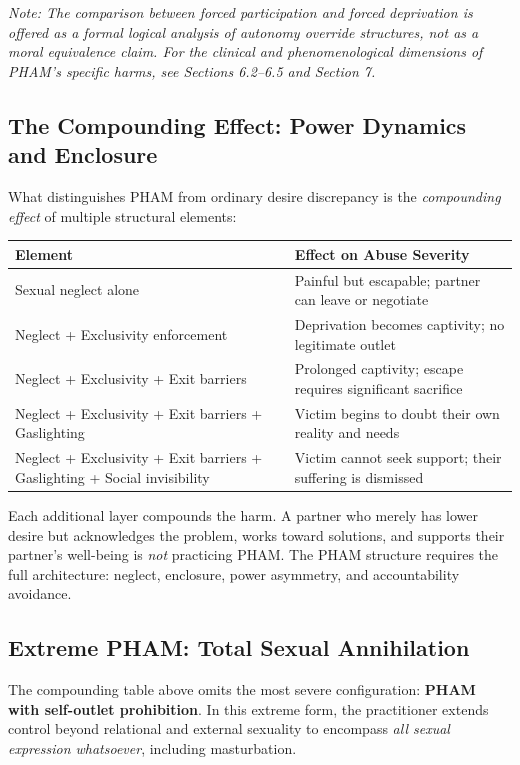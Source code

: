 \documentclass[12pt,openany]{book}
\numberwithin{equation}{chapter}
\begin{document}
\textit{Note: The comparison between forced participation and forced deprivation is offered as a formal logical analysis of autonomy override structures, not as a moral equivalence claim. For the clinical and phenomenological dimensions of PHAM's specific harms, see Sections 6.2--6.5 and Section 7.}

\subsection{The Compounding Effect: Power Dynamics and Enclosure}

What distinguishes PHAM from ordinary desire discrepancy is the \textit{compounding effect} of multiple structural elements:

\begin{center}
\begin{tabular}{|p{2.5in}|p{2.5in}|}
\hline
\textbf{Element} & \textbf{Effect on Abuse Severity} \\
\hline
Sexual neglect alone & Painful but escapable; partner can leave or negotiate \\
\hline
Neglect + Exclusivity enforcement & Deprivation becomes captivity; no legitimate outlet \\
\hline
Neglect + Exclusivity + Exit barriers & Prolonged captivity; escape requires significant sacrifice \\
\hline
Neglect + Exclusivity + Exit barriers + Gaslighting & Victim begins to doubt their own reality and needs \\
\hline
Neglect + Exclusivity + Exit barriers + Gaslighting + Social invisibility & Victim cannot seek support; their suffering is dismissed \\
\hline
\end{tabular}
\end{center}

Each additional layer compounds the harm. A partner who merely has lower desire but acknowledges the problem, works toward solutions, and supports their partner's well-being is \textit{not} practicing PHAM. The PHAM structure requires the full architecture: neglect, enclosure, power asymmetry, and accountability avoidance.

\subsection{Extreme PHAM: Total Sexual Annihilation}

The compounding table above omits the most severe configuration: \textbf{PHAM with self-outlet prohibition}. In this extreme form, the practitioner extends control beyond relational and external sexuality to encompass \textit{all sexual expression whatsoever}, including masturbation.
\end{document}
